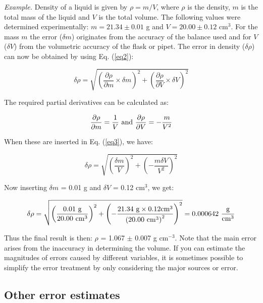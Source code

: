\documentclass[byrevtex,amssymb,aps,pra,floatfix,letterpaper]{revtex4}
\begin{document}
\noindent
\textit{Example.} Density of a liquid is given by $\rho = m / V$, where $\rho$ is the density, $m$ is the total mass of
the liquid and $V$ is the total volume. The following values were determined experimentally: $m =
21.34 \pm 0.01$ g and $V = 20.00 \pm 0.12$ cm$^3$. For the mass $m$ the error ($\delta m$) originates from the
accuracy of the balance used and for $V$ ($\delta V$) from the volumetric accuracy of the flask or pipet.
The error in density ($\delta\rho$) can now be obtained by using Eq. (\ref{eq2}):

\begin{equation}
\label{eq3}
\delta\rho = \sqrt{\left(\frac{\partial\rho}{\partial m}\times\delta m\right)^2 + \left(\frac{\partial\rho}{\partial V}\times\delta V\right)^2}
\end{equation}

\noindent
The required partial derivatives can be calculated as:

\begin{equation}
\label{eq4}
\frac{\partial\rho}{\partial m} = \frac{1}{V}\textnormal{ and }\frac{\partial\rho}{\partial V} = -\frac{m}{V^2} 
\end{equation}

\noindent
When these are inserted in Eq. (\ref{eq3}), we have:

\begin{equation}
\label{eq5}
\delta\rho = \sqrt{\left(\frac{\delta m}{V}\right)^2 + \left(-\frac{m\delta V}{V^2}\right)^2}
\end{equation}

\noindent
Now inserting $\delta m$ = 0.01 g and $\delta V$ = 0.12 cm$^3$, we get:

\begin{equation}
\label{eq6}
\delta\rho = \sqrt{\left(\frac{0.01\textnormal{ g}}{20.00\textnormal{ cm}^3}\right)^2 + \left(-\frac{21.34\textnormal{ g}\times0.12\textnormal{cm}^3}{\left(20.00\textnormal{ cm}^3\right)^2}\right)^2} = 0.000642\textnormal{~}\frac{\textnormal{g}}{\textnormal{cm}^3}
\end{equation}

\noindent
Thus the final result is then: $\rho$ = 1.067 $\pm$ 0.007 g cm$^{-3}$. Note that the main error arises from the
inaccuracy in determining the volume. If you can estimate the magnitudes of errors caused by
different variables, it is sometimes possible to simplify the error treatment by only considering the
major sources or error.

\subsection{Other error estimates}
\end{document}
